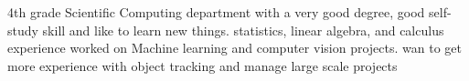 \documentclass[letter,10pt]{article}
\begin{document}



4th grade Scientific Computing department with a very good degree, good self-study skill and like to learn new things. statistics, linear algebra, and calculus experience worked on Machine learning and computer vision projects. wan to get more experience with object tracking and manage large scale projects
\end{document}
